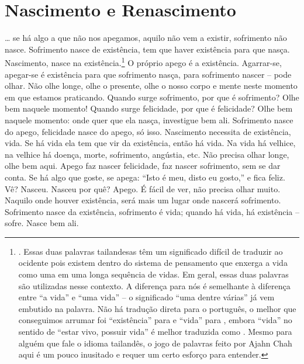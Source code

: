 
\chapter{Nascimento e Renascimento}
\markright{\theChapterAuthor}

\ldots{} se há algo a que não nos apegamos, aquilo não vem a existir,
sofrimento não nasce. Sofrimento nasce de existência, tem que haver
existência para que nasça. Nascimento, nasce na
existência.\footnote{. Essas duas
palavras tailandesas têm um significado difícil de traduzir ao ocidente
pois existem dentro do sistema de pensamento que enxerga a vida como
uma em uma longa sequência de vidas. Em geral, essas duas palavras são
utilizadas nesse contexto. A diferença para nós é semelhante à
diferença entre “a vida” e “uma vida” -- o significado “uma dentre
várias” já vem embutido na palavra. Não há tradução direta para o
português, o melhor que conseguimos arrumar foi “existência” para
 e “vida” para , embora “vida” no
sentido de “estar vivo, possuir vida” é melhor traduzida como
. Mesmo para alguém que fale o idioma
tailandês, o jogo de palavras feito por Ajahn Chah aqui é um pouco
inusitado e requer um certo esforço para entender.} O próprio apego é
a existência. Agarrar-se, apegar-se é existência para que sofrimento
nasça, para sofrimento nascer – pode olhar. Não olhe longe, olhe o
presente, olhe o nosso corpo e mente neste momento em que estamos
praticando. Quando surge sofrimento, por que é sofrimento? Olhe bem
naquele momento! Quando surge felicidade, por que é felicidade? Olhe
bem naquele momento: onde quer que ela nasça, investigue bem ali.
Sofrimento nasce do apego, felicidade nasce do apego, só isso.
Nascimento necessita de existência, vida. Se há vida ela tem que vir da
existência, então há vida. Na vida há velhice, na velhice há doença,
morte, sofrimento, angústia, etc. Não precisa olhar longe, olhe bem
aqui. Apego faz nascer felicidade, faz nascer sofrimento, sem se dar
conta. Se há algo que goste, se apega: “Isto é meu, disto eu gosto,” e
fica feliz. Vê? Nasceu. Nasceu por quê? Apego. É fácil de ver, não
precisa olhar muito. Naquilo onde houver existência, será mais um lugar
onde nascerá sofrimento. Sofrimento nasce da existência, sofrimento é
vida; quando há vida, há existência – sofre. Nasce bem ali. 

